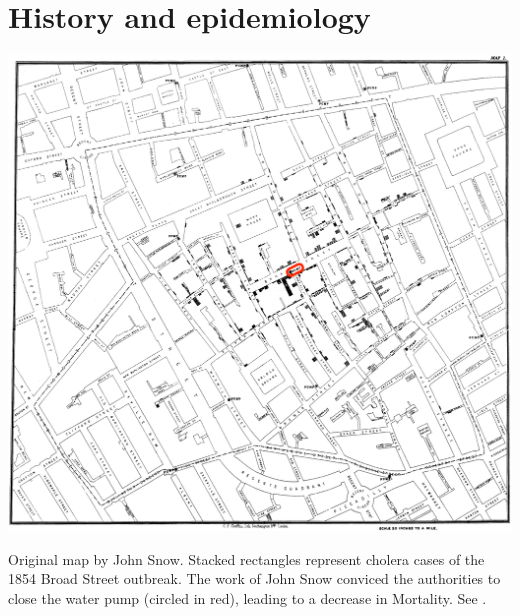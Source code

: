 \section{History and epidemiology}
\begin{marginfigure}[3\baselineskip]
\includegraphics[width=\textwidth]{fig/snow-cholera-map_edit}
\caption[John Snow map of cluster cholera cases in London, 1854]{\footnotesize Original map by John Snow. Stacked rectangles represent cholera cases of the 1854 Broad Street outbreak. The work of John Snow conviced the authorities to close the water pump (circled in red), leading to a decrease in Mortality. See .}\label{johnsnow}
\end{marginfigure}
